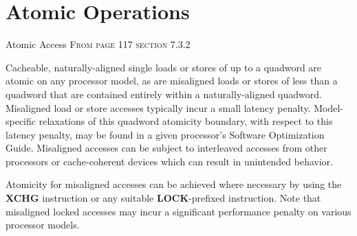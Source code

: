 \documentclass[10pt]{beamer}
\begin{document}
%
%
%
%
%




\section{Atomic Operations}

\begin{frame}{Atomic Access}
    \textsc{From page 117 section 7.3.2 \cite{AMD64ArchVol2}}

    \alert{Cacheable, naturally-aligned single loads or stores} of up to a
quadword \alert{are atomic on any processor model}, as are misaligned loads or stores of less than a quadword that are contained entirely within a naturally-aligned quadword.
Misaligned load or store accesses typically incur a small latency penalty.
Model-specific relaxations of this quadword atomicity boundary, with respect to this latency penalty, may be found in a given processor's Software Optimization Guide.
Misaligned accesses can be subject to interleaved accesses from other processors or cache-coherent devices which can result in unintended behavior.

Atomicity \alert{for misaligned} accesses can be achieved
where necessary by using the \textbf{XCHG} instruction or any suitable \textbf{LOCK}-prefixed instruction.
Note that misaligned locked accesses may incur a significant performance penalty on various processor models.
\end{frame}
\end{document}
